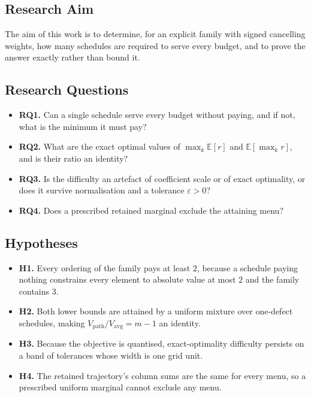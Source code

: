 \documentclass[conference]{IEEEtran}
\theoremstyle{definition}
\begin{document}
\subsection{Research Aim}

The aim of this work is to determine, for an explicit family with signed cancelling weights,
how many schedules are required to serve every budget, and to prove the answer exactly rather
than bound it.

\subsection{Research Questions}

\begin{itemize}
\item \textbf{RQ1.} Can a single schedule serve every budget without paying, and if not, what
is the minimum it must pay?
\item \textbf{RQ2.} What are the exact optimal values of $\max_{k}\mathbb{E}[r]$ and
$\mathbb{E}[\max_{k}r]$, and is their ratio an identity?
\item \textbf{RQ3.} Is the difficulty an artefact of coefficient scale or of exact
optimality, or does it survive normalisation and a tolerance $\varepsilon>0$?
\item \textbf{RQ4.} Does a prescribed retained marginal exclude the attaining menu?
\end{itemize}

\subsection{Hypotheses}

\begin{itemize}
\item \textbf{H1.} Every ordering of the family pays at least $2$, because a schedule paying
nothing constrains every element to absolute value at most $2$ and the family contains $3$.
\item \textbf{H2.} Both lower bounds are attained by a uniform mixture over one-defect
schedules, making $V_{\mathrm{path}}/V_{\mathrm{avg}}=m-1$ an identity.
\item \textbf{H3.} Because the objective is quantised, exact-optimality difficulty persists
on a band of tolerances whose width is one grid unit.
\item \textbf{H4.} The retained trajectory's column sums are the same for every menu, so a
prescribed uniform marginal cannot exclude any menu.
\end{itemize}
\end{document}
